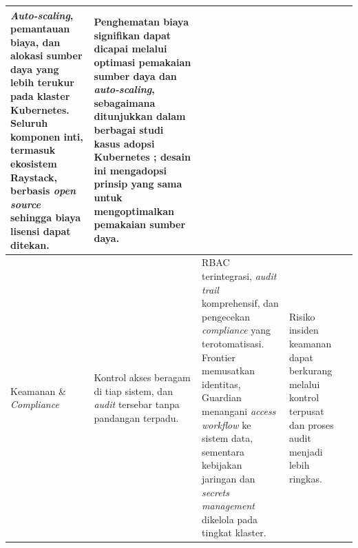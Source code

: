 {\begin{longtable}{|m{2cm}|m{2.5cm}|m{2.5cm}|m{3cm}|m{2cm}|}
\textit{Auto-scaling}, pemantauan biaya, dan alokasi sumber daya yang lebih terukur pada klaster Kubernetes. Seluruh komponen inti, termasuk ekosistem Raystack, berbasis \textit{open source} sehingga biaya lisensi dapat ditekan. &
Penghematan biaya signifikan dapat dicapai melalui optimasi pemakaian sumber daya dan \textit{auto-scaling}, sebagaimana ditunjukkan dalam berbagai studi kasus adopsi Kubernetes \autocite{lakka2025kubernetes}; desain ini mengadopsi prinsip yang sama untuk mengoptimalkan pemakaian sumber daya. &
\autocite{lakka2025kubernetes} \\
\hline
Keamanan \& \textit{Compliance} &
Kontrol akses beragam di tiap sistem, dan \textit{audit} tersebar tanpa pandangan terpadu. &
RBAC terintegrasi, \textit{audit trail} komprehensif, dan pengecekan \textit{compliance} yang terotomatisasi. Frontier memusatkan identitas, Guardian menangani \textit{access workflow} ke sistem data, sementara kebijakan jaringan dan \textit{secrets management} dikelola pada tingkat klaster. &
Risiko insiden keamanan dapat berkurang melalui kontrol terpusat dan proses audit menjadi lebih ringkas. &
\autocite{ahmad2024mlops} \\
\hline
\end{longtable}
}